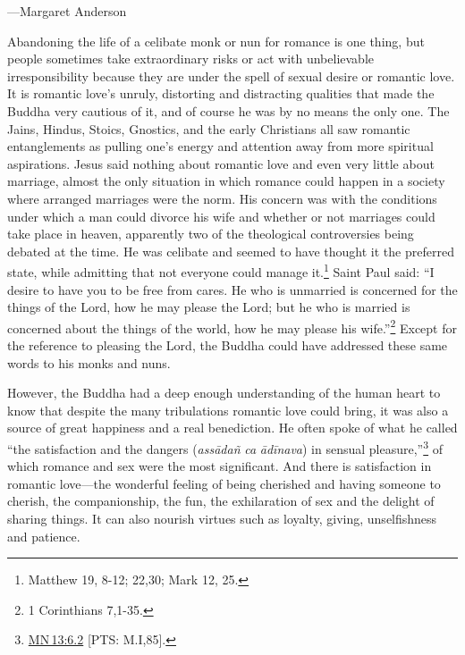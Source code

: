 \documentclass[10pt, openright]{book}
\newenvironment{epigram-2-cite}%
{%
\quoting[leftmargin=2.5cm,rightmargin=2.5cm]%
\noindent\normal\hspace*{\fill} 
}%
{\endquoting\vspace{1em}
}%
\begin{document}
\begin{epigram-2-cite}
—Margaret Anderson
\end{epigram-2-cite}

Abandoning the life of a celibate monk or nun for romance is one thing, but people sometimes take extraordinary risks or act with unbelievable irresponsibility because they are under the spell of sexual desire or romantic love. It is romantic love’s unruly, distorting and distracting qualities that made the Buddha very cautious of it, and of course he was by no means the only one. The Jains, Hindus, Stoics, Gnostics, and the early Christians all saw romantic entanglements as pulling one’s energy and attention away from more spiritual aspirations. Jesus said nothing about romantic love and even very little about marriage, almost the only situation in which romance could happen in a society where arranged marriages were the norm. His concern was with the conditions under which a man could divorce his wife and whether or not marriages could take place in heaven, apparently two of the theological controversies being debated at the time. He was celibate and seemed to have thought it the preferred state, while admitting that not everyone could manage it.\footnote {Matthew 19, 8-12; 22,30; Mark 12, 25.} Saint Paul said: “I desire to have you to be free from cares. He who is unmarried is concerned for the things of the Lord, how he may please the Lord; but he who is married is concerned about the things of the world, how he may please his wife.”\footnote {1 Corinthians 7,1-35.} Except for the reference to pleasing the Lord, the Buddha could have addressed these same words to his monks and nuns.


However, the Buddha had a deep enough understanding of the human heart to know that despite the many tribulations romantic love could bring, it was also a source of great happiness and a real benediction. He often spoke of what he called “the satisfaction and the dangers (\textit{assādañ} \textit{ca} \textit{ādīnava}) in sensual pleasure,”\footnote {\href{https://suttacentral.net/mn13/en/sujato\#6.2}{MN 13:6.2} [PTS: M.I,85].} of which romance and sex were the most significant. And there is satisfaction in romantic love—the wonderful feeling of being cherished and having someone to cherish, the companionship, the fun, the exhilaration of sex and the delight of sharing things. It can also nourish virtues such as loyalty, giving, unselfishness and patience.
\end{document}
